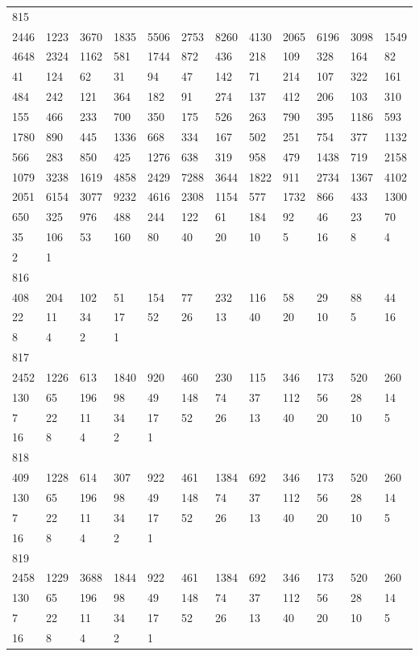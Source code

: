 \begin{longtable}{llllllllllll}
815&&&&&&&&&&&\\
2446& 1223& 3670& 1835& 5506& 2753& 8260& 4130& 2065& 6196& 3098& 1549\\
4648& 2324& 1162& 581& 1744& 872& 436& 218& 109& 328& 164& 82\\
41& 124& 62& 31& 94& 47& 142& 71& 214& 107& 322& 161\\
484& 242& 121& 364& 182& 91& 274& 137& 412& 206& 103& 310\\
155& 466& 233& 700& 350& 175& 526& 263& 790& 395& 1186& 593\\
1780& 890& 445& 1336& 668& 334& 167& 502& 251& 754& 377& 1132\\
566& 283& 850& 425& 1276& 638& 319& 958& 479& 1438& 719& 2158\\
1079& 3238& 1619& 4858& 2429& 7288& 3644& 1822& 911& 2734& 1367& 4102\\
2051& 6154& 3077& 9232& 4616& 2308& 1154& 577& 1732& 866& 433& 1300\\
650& 325& 976& 488& 244& 122& 61& 184& 92& 46& 23& 70\\
35& 106& 53& 160& 80& 40& 20& 10& 5& 16& 8& 4\\
2& 1& \\

816&&&&&&&&&&&\\
408& 204& 102& 51& 154& 77& 232& 116& 58& 29& 88& 44\\
22& 11& 34& 17& 52& 26& 13& 40& 20& 10& 5& 16\\
8& 4& 2& 1& \\

817&&&&&&&&&&&\\
2452& 1226& 613& 1840& 920& 460& 230& 115& 346& 173& 520& 260\\
130& 65& 196& 98& 49& 148& 74& 37& 112& 56& 28& 14\\
7& 22& 11& 34& 17& 52& 26& 13& 40& 20& 10& 5\\
16& 8& 4& 2& 1& \\

818&&&&&&&&&&&\\
409& 1228& 614& 307& 922& 461& 1384& 692& 346& 173& 520& 260\\
130& 65& 196& 98& 49& 148& 74& 37& 112& 56& 28& 14\\
7& 22& 11& 34& 17& 52& 26& 13& 40& 20& 10& 5\\
16& 8& 4& 2& 1& \\

819&&&&&&&&&&&\\
2458& 1229& 3688& 1844& 922& 461& 1384& 692& 346& 173& 520& 260\\
130& 65& 196& 98& 49& 148& 74& 37& 112& 56& 28& 14\\
7& 22& 11& 34& 17& 52& 26& 13& 40& 20& 10& 5\\
16& 8& 4& 2& 1& \\


\end{longtable}
